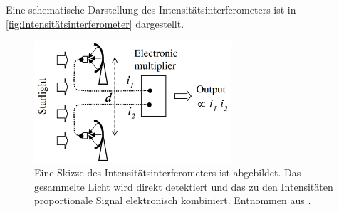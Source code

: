 Eine schematische Darstellung des Intensitätsinterferometers ist in \autoref{fig:Intensitätsinterferometer} dargestellt. 
\begin{figure}[h]
    \centering
    \includegraphics[width=0.65\textwidth]{images/Theorie/Fox_6.1b.png}
    \caption{Eine Skizze des Intensitätsinterferometers ist abgebildet. Das gesammelte Licht wird direkt detektiert und das zu den Intensitäten proportionale Signal elektronisch kombiniert. Entnommen aus \cite[Fig. 6.1(b)]{foxQuantumOpticsIntroduction2006}.}
    \label{fig:Intensitätsinterferometer}
\end{figure}

